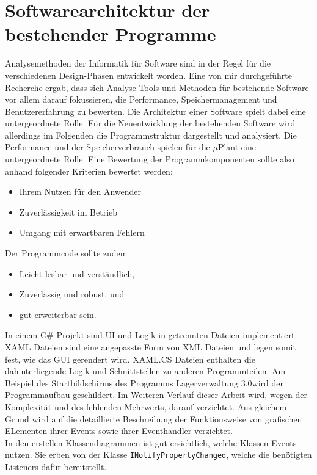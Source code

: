 

\chapter{Softwarearchitektur der bestehender Programme}\label{Kap2}

    Analysemethoden der Informatik für Software sind in der Regel für die verschiedenen Design-Phasen entwickelt worden.
    Eine von mir durchgeführte Recherche ergab, dass sich Analyse-Tools und Methoden für bestehende Software vor
    allem darauf fokussieren, die Performance, Speichermanagement und Benutzererfahrung zu bewerten.
    Die Architektur einer Software spielt dabei eine untergeordnete Rolle.
    Für die Neuentwicklung der bestehenden Software wird allerdings im Folgenden die Programmstruktur dargestellt und analysiert.
    Die Performance und der Speicherverbrauch spielen für die $\mu$Plant eine untergeordnete Rolle.
    Eine Bewertung der Programmkomponenten sollte also anhand folgender Kriterien bewertet werden:

    \begin{itemize}
        \item Ihrem Nutzen für den Anwender
        \item Zuverlässigkeit im Betrieb
        \item Umgang mit erwartbaren Fehlern
    \end{itemize}

    Der Programmcode sollte zudem
    \begin{itemize}
        \item Leicht lesbar und verständlich,
        \item Zuverlässig und robust, und
        \item gut erweiterbar sein.
    \end{itemize}
    In einem C$\#$ Projekt sind UI und Logik in getrennten Dateien implementiert.
    XAML Dateien sind eine angepasste Form von XML Dateien und legen somit fest, wie das GUI gerendert wird.
    XAML.CS Dateien enthalten die dahinterliegende Logik und Schnittstellen zu anderen Programmteilen.
    Am Beispiel des Startbildschirms des Programms \glqq Lagerverwaltung 3.0\grqq wird der Programmaufbau geschildert.
    Im Weiteren Verlauf dieser Arbeit wird, wegen der Komplexität und des fehlenden Mehrwerts, darauf verzichtet.
    Aus gleichem Grund wird auf die detaillierte Beschreibung der Funktionsweise von grafischen ELementen ihrer Events
    sowie ihrer Eventhandler verzichtet.
    \\
    In den erstellen Klassendiagrammen ist gut ersichtlich, welche Klassen Events nutzen.
    Sie erben von der Klasse \verb|INotifyPropertyChanged|, welche die benötigten Listeners dafür bereitstellt.


